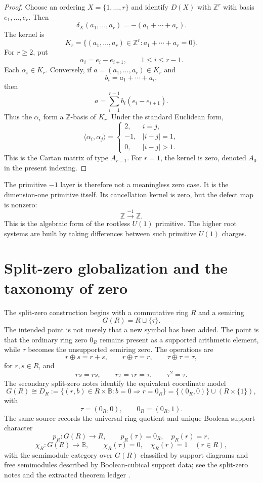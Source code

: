\documentclass[11pt]{article}
\theoremstyle{remark}
\newcommand{\ZZ}{\mathbb Z}
\newcommand{\BB}{\mathbb B}
\begin{document}
\begin{proof}
Choose an ordering $X=\{1,\ldots,r\}$ and identify $D(X)$ with $\ZZ^r$ with basis $e_1,\ldots,e_r$.  Then
\[
        \delta_X(a_1,\ldots,a_r)=-(a_1+\cdots+a_r).
\]
The kernel is
\[
        K_r=\{(a_1,\ldots,a_r)\in\ZZ^r: a_1+\cdots+a_r=0\}.
\]
For $r\geq2$, put
\[
        \alpha_i=e_i-e_{i+1},\qquad 1\leq i\leq r-1.
\]
Each $\alpha_i\in K_r$.  Conversely, if $a=(a_1,\ldots,a_r)\in K_r$ and
\[
        b_i=a_1+\cdots+a_i,
\]
then
\[
        a=\sum_{i=1}^{r-1}b_i(e_i-e_{i+1}).
\]
Thus the $\alpha_i$ form a $\ZZ$-basis of $K_r$.  Under the standard Euclidean form,
\[
        \langle\alpha_i,\alpha_j\rangle=
        \begin{cases}
        2,& i=j,\\
        -1,& |i-j|=1,\\
        0,& |i-j|>1.
        \end{cases}
\]
This is the Cartan matrix of type $A_{r-1}$.  For $r=1$, the kernel is zero, denoted $A_0$ in the present indexing.\end{proof}

The primitive $-1$ layer is therefore not a meaningless zero case.  It is the dimension-one primitive itself.  Its cancellation kernel is zero, but the defect map is nonzero:
\[
        \ZZ\xrightarrow{-1}\ZZ.
\]
This is the algebraic form of the rootless $U(1)$ primitive.  The higher root systems are built by taking differences between such primitive $U(1)$ charges.

\section{Split-zero globalization and the taxonomy of zero}

The split-zero construction begins with a commutative ring $R$ and a semiring
\[
        G(R)=R\sqcup\{\tau\}.
\]
The intended point is not merely that a new symbol has been added.  The point is that the ordinary ring zero $0_R$ remains present as a supported arithmetic element, while $\tau$ becomes the unsupported semiring zero.  The operations are
\[
        r\oplus s=r+s,
        \qquad
        r\oplus\tau=r,
        \qquad
        \tau\oplus\tau=\tau,
\]
for $r,s\in R$, and
\[
        rs=rs,
        \qquad
        r\tau=\tau r=\tau,
        \qquad
        \tau^2=\tau.
\]
The secondary split-zero notes identify the equivalent coordinate model
\[
        G(R)\cong D_R:=\{(r,b)\in R\times\BB: b=0\Rightarrow r=0_R\}
        =\{(0_R,0)\}\cup(R\times\{1\}),
\]
with
\[
        \tau=(0_R,0),
        \qquad
        0_R=(0_R,1).
\]
The same source records the universal ring quotient and unique Boolean support character
\[
        p_R:G(R)\to R,
        \qquad
        p_R(\tau)=0_R,
        \quad p_R(r)=r,
\]
\[
        \chi_R:G(R)\to\BB,
        \qquad
        \chi_R(\tau)=0,
        \quad \chi_R(r)=1\quad(r\in R),
\]
with the semimodule category over $G(R)$ classified by support diagrams and free semimodules described by Boolean-cubical support data; see the split-zero notes and the extracted theorem ledger \cite{SplitZeroNotes}.
\end{document}
